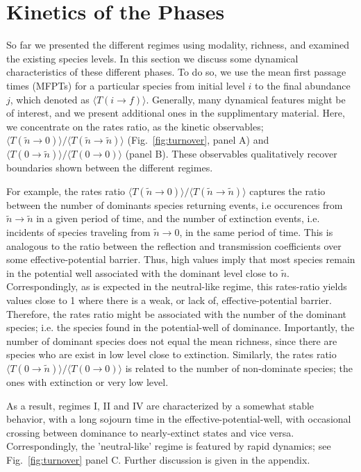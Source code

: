 \documentclass[9pt,lineno]{elife}
\begin{document}
\section{Kinetics of the Phases}
\label{sec:Dynamics}

So far we presented the different regimes using modality, richness, and examined the existing species levels. 
In this section we discuss some dynamical characteristics of these different phases. 
To do so, we use the  mean first passage times (MFPTs) for a particular species from initial level $i$ to  the final abundance $j$, which denoted as $\langle T(i \rightarrow f)\rangle$. 
Generally, many dynamical features might be of interest, and we present additional ones in the supplimentary material.  
Here, we concentrate on  the rates ratio, as the kinetic observables; $\langle T(\tilde{n}\rightarrow 0)\rangle /\langle T(\tilde{n}\rightarrow \tilde{n})\rangle $ (Fig.~\ref{fig:turnover}, panel A) and $\langle T(0\rightarrow \tilde{n})\rangle /\langle T(0\rightarrow 0)\rangle $ (panel B). 
These observables qualitatively recover boundaries shown between the different regimes. 

For example, the rates ratio $\langle T(\tilde{n}\rightarrow 0)\rangle /\langle T(\tilde{n}\rightarrow \tilde{n})\rangle $ captures the ratio between the number of dominants species returning events, i.e occurences from $\tilde{n}\rightarrow \tilde{n} $ in a given period of time, and the number of extinction events, i.e. incidents of species traveling from  $\tilde{n}\rightarrow 0 $, in the same period of time. 
This is analogous to the ratio between the reflection and transmission coefficients over some effective-potential barrier. 
Thus, high values imply that most species remain in the potential well associated with the dominant level close to $\tilde{n}$. 
Correspondingly, as is expected in the neutral-like regime, this rates-ratio yields values close to 1 where there is a weak, or lack of, effective-potential barrier. Therefore, the rates ratio might be associated with the number of the dominant species; i.e. the species found in the potential-well of dominance. 
Importantly, the number of dominant species does not equal the mean richness, since there are species who are exist in low level close to extinction.  
Similarly, the rates ratio $\langle T(0\rightarrow \tilde{n})\rangle /\langle T(0\rightarrow 0)\rangle $ is related to the number of non-dominate species; the ones with extinction or very low level. 

As a result, regimes I, II and IV are characterized by a somewhat stable behavior, with a long sojourn time in the effective-potential-well, with occasional crossing between dominance to nearly-extinct states and vice versa. 
Correspondingly, the 'neutral-like' regime is featured by rapid dynamics; see Fig.~\ref{fig:turnover} panel C. Further discussion is given in the appendix. 
\end{document}
